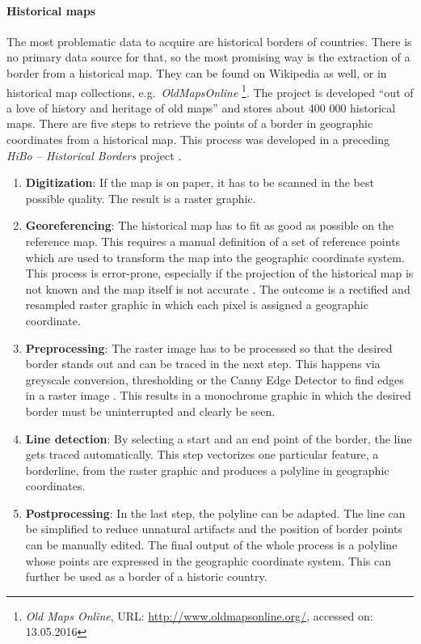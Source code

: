 \paragraph{Historical maps} %
\label{par:historical_map}

The most problematic data to acquire are historical borders of countries. There is no primary data source for that, so the most promising way is the extraction of a border from a historical map. They can be found on Wikipedia as well, or in historical map collections, e.g.\ \emph{OldMapsOnline}
\footnote{
  \textit{Old Maps Online},
  URL: \url{http://www.oldmapsonline.org/},
  accessed on: 13.05.2016
}.
The project is developed ``out of a love of history and heritage of old maps'' and stores about 400 000 historical maps.
There are five steps to retrieve the points of a border in geographic coordinates from a historical map. This process was developed in a preceding \emph{HiBo -- Historical Borders} project \cite{hibo}.

\begin{enumerate}
  \item \textbf{Digitization}: If the map is on paper, it has to be scanned in the best possible quality. The result is a raster graphic.
  \item \textbf{Georeferencing}: The historical map has to fit as good as possible on the reference map. This requires a manual definition of a set of reference points which are used to transform the map into the geographic coordinate system. This process is error-prone, especially if the projection of the historical map is not known and the map itself is not accurate
  \cite{knowles2002past}.
  The outcome is a rectified and resampled raster graphic in which each pixel is assigned a geographic coordinate.
  \item \textbf{Preprocessing}: The raster image has to be processed so that the desired border stands out and can be traced in the next step. This happens via greyscale conversion, thresholding or the Canny Edge Detector to find edges in a raster image \cite{canny}. This results in a monochrome graphic in which the desired border must be uninterrupted and clearly be seen.
  \item \textbf{Line detection}: By selecting a start and an end point of the border, the line gets traced automatically. This step vectorizes one particular feature, a borderline, from the raster graphic and produces a polyline in geographic coordinates.
  \item \textbf{Postprocessing}: In the last step, the polyline can be adapted. The line can be simplified to reduce unnatural artifacts and the position of border points can be manually edited. The final output of the whole process is a polyline whose points are expressed in the geographic coordinate system. This can further be used as a border of a historic country.
\end{enumerate}

